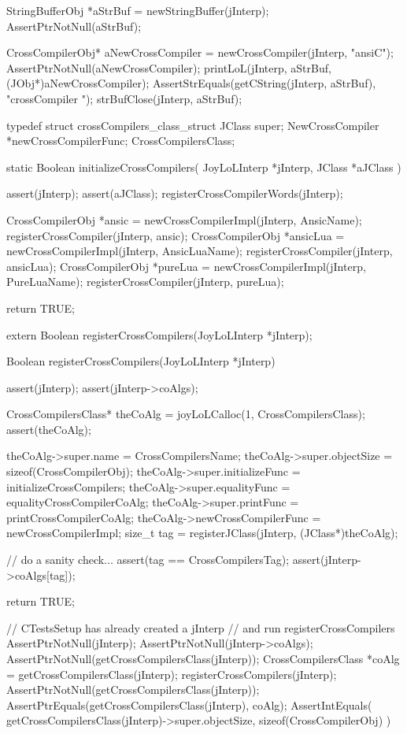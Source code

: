   StringBufferObj *aStrBuf = newStringBuffer(jInterp);
  AssertPtrNotNull(aStrBuf);
  
  CrossCompilerObj* aNewCrossCompiler =
    newCrossCompiler(jInterp, "ansiC");
  AssertPtrNotNull(aNewCrossCompiler);
  printLoL(jInterp, aStrBuf, (JObj*)aNewCrossCompiler);
  AssertStrEquals(getCString(jInterp, aStrBuf), "crossCompiler ");
  strBufClose(jInterp, aStrBuf);
\stopCTest
\stopTestCase
\stopTestSuite

\startTestSuite[registerCrossCompilers]

\startCHeader
typedef struct crossCompilers_class_struct {
  JClass       super;
  NewCrossCompiler      *newCrossCompilerFunc;
} CrossCompilersClass;

\stopCHeader

\startCCode
static Boolean initializeCrossCompilers(
  JoyLoLInterp *jInterp,
  JClass   *aJClass
) {
  assert(jInterp);
  assert(aJClass);
  registerCrossCompilerWords(jInterp);

  CrossCompilerObj *ansic =
    newCrossCompilerImpl(jInterp, AnsicName);
  registerCrossCompiler(jInterp, ansic);
  CrossCompilerObj *ansicLua =
    newCrossCompilerImpl(jInterp, AnsicLuaName);
  registerCrossCompiler(jInterp, ansicLua);
  CrossCompilerObj *pureLua =
    newCrossCompilerImpl(jInterp, PureLuaName);
  registerCrossCompiler(jInterp, pureLua);

  return TRUE;
}
\stopCCode

\startCHeader
extern Boolean registerCrossCompilers(JoyLoLInterp *jInterp);
\stopCHeader
{}

\startCCode
Boolean registerCrossCompilers(JoyLoLInterp *jInterp) {
  assert(jInterp);
  assert(jInterp->coAlgs);
  
  CrossCompilersClass* theCoAlg
    = joyLoLCalloc(1, CrossCompilersClass);
  assert(theCoAlg);
  
  theCoAlg->super.name           = CrossCompilersName;
  theCoAlg->super.objectSize     = sizeof(CrossCompilerObj);
  theCoAlg->super.initializeFunc = initializeCrossCompilers;
  theCoAlg->super.equalityFunc   = equalityCrossCompilerCoAlg;
  theCoAlg->super.printFunc      = printCrossCompilerCoAlg;
  theCoAlg->newCrossCompilerFunc = newCrossCompilerImpl;
  size_t tag =
    registerJClass(jInterp, (JClass*)theCoAlg);
  
  // do a sanity check...
  assert(tag == CrossCompilersTag);
  assert(jInterp->coAlgs[tag]);
   
  return TRUE;
}
\stopCCode


\startCTest
  // CTestsSetup has already created a jInterp
  // and run registerCrossCompilers
  AssertPtrNotNull(jInterp);
  AssertPtrNotNull(jInterp->coAlgs);
  AssertPtrNotNull(getCrossCompilersClass(jInterp));
  CrossCompilersClass *coAlg = getCrossCompilersClass(jInterp);
  registerCrossCompilers(jInterp);
  AssertPtrNotNull(getCrossCompilersClass(jInterp));
  AssertPtrEquals(getCrossCompilersClass(jInterp), coAlg);
  AssertIntEquals(
    getCrossCompilersClass(jInterp)->super.objectSize,
    sizeof(CrossCompilerObj)
  )
\stopCTest
\stopTestCase
\stopTestSuite
